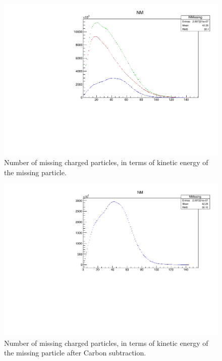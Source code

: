 \documentclass[a4paper,12pt]{article}
\begin{document}
\begin{figure}
\includegraphics[width=\textwidth]{nm_b4.pdf}
\caption{Number of missing charged particles, in terms of kinetic energy of the missing particle. }
\end{figure}

\begin{figure}
\includegraphics[width=\textwidth]{nm.pdf}
\caption{Number of missing charged particles, in terms of kinetic energy of the missing particle after Carbon subtraction. }
\end{figure}
\end{document}
